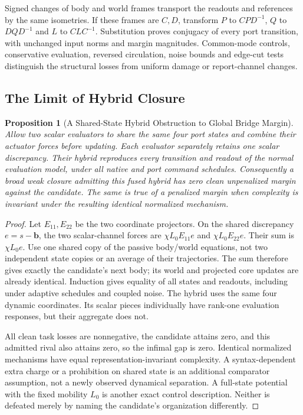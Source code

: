 \documentclass[11pt,a4paper]{article}
\newtheorem{proposition}[theorem]{Proposition}
\theoremstyle{definition}
\begin{document}
Signed changes of body and world frames transport the readouts and references by the same isometries. If these frames are $C,D$, transform $P$ to $CPD^{-1}$, $Q$ to $DQD^{-1}$ and $L$ to $CLC^{-1}$. Substitution proves conjugacy of every port transition, with unchanged input norms and margin magnitudes. Common-mode controls, conservative evaluation, reversed circulation, noise bounds and edge-cut tests distinguish the structural losses from uniform damage or report-channel changes.

\subsection{The Limit of Hybrid Closure}

\begin{proposition}[A Shared-State Hybrid Obstruction to Global Bridge Margin]\label{prop:bridge-shared-hybrid-obstruction}
Allow two scalar evaluators to share the same four port states and combine their actuator forces before updating. Each evaluator separately retains one scalar discrepancy. Their hybrid reproduces every transition and readout of the normal evaluation model, under all native and port command schedules. Consequently a broad weak closure admitting this fused hybrid has zero clean unpenalized margin against the candidate. The same is true of a penalized margin when complexity is invariant under the resulting identical normalized mechanism.
\end{proposition}
\begin{proof}
Let $E_{11},E_{22}$ be the two coordinate projectors. On the shared discrepancy $e=s-\mathbf b$, the two scalar-channel forces are $\chi L_0E_{11}e$ and $\chi L_0E_{22}e$. Their sum is $\chi L_0e$. Use one shared copy of the passive body/world equations, not two independent state copies or an average of their trajectories. The sum therefore gives exactly the candidate's next body; its world and projected core updates are already identical. Induction gives equality of all states and readouts, including under adaptive schedules and coupled noise. The hybrid uses the same four dynamic coordinates. Its scalar pieces individually have rank-one evaluation responses, but their aggregate does not.

All clean task losses are nonnegative, the candidate attains zero, and this admitted rival also attains zero, so the infimal gap is zero. Identical normalized mechanisms have equal representation-invariant complexity. A syntax-dependent extra charge or a prohibition on shared state is an additional comparator assumption, not a newly observed dynamical separation. A full-state potential with the fixed mobility $L_0$ is another exact control description. Neither is defeated merely by naming the candidate's organization differently.
\end{proof}
\end{document}

